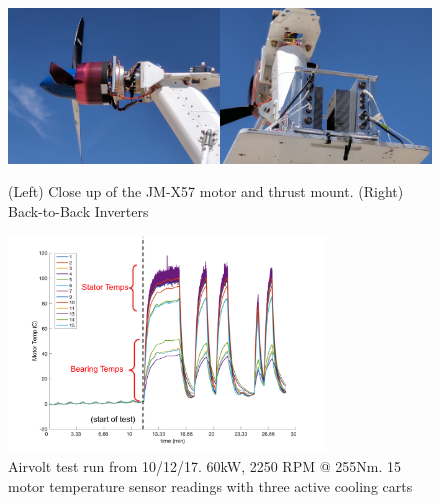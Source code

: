 \documentclass[]{aiaa-tc}%
\begin{document}
\begin{figure}[!htb]%
	\centering
	\includegraphics[width=0.5\textwidth]{figures/AirVoltSide.jpg}\includegraphics[width=0.5\textwidth]{figures/AirVolt_Back.jpg}
	\caption{(Left) Close up of the JM-X57 motor and thrust mount. (Right) Back-to-Back Inverters}
	\label{fig:airvolt2}
\end{figure}

\begin{figure}[!htb]%
	\centering
	\includegraphics[width=0.75\textwidth]{figures/10_12_cleanedv2.png}
	\caption{Airvolt test run from 10/12/17. 60kW, 2250 RPM @ 255Nm. 15 motor temperature sensor readings with three active cooling carts}
	\label{fig:airvoltData}
\end{figure}
\end{document}
